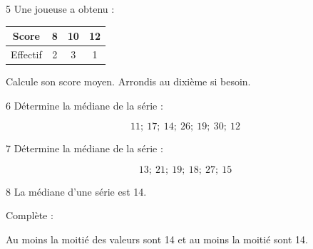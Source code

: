 \documentclass[9.5pt,a4paper,landscape]{article}
\begin{document}

\noindent
\begin{minipage}[t]{0.242\linewidth}
\begin{exo}{5}
Une joueuse a obtenu :

\begin{center}
\begin{tabular}{c|ccc}
Score & 8 & 10 & 12\\
\hline
Effectif & 2 & 3 & 1
\end{tabular}
\end{center}

Calcule son score moyen.
Arrondis au dixième si besoin.
\end{exo}
\end{minipage}
\hfill
%
\begin{minipage}[t]{0.242\linewidth}
\begin{exo}{6}
Détermine la médiane de la série :

\[
11;\ 17;\ 14;\ 26;\ 19;\ 30;\ 12
\]
\end{exo}
\end{minipage}
\hfill
%
\begin{minipage}[t]{0.242\linewidth}
\begin{exo}{7}
Détermine la médiane de la série :

\[
13;\ 21;\ 19;\ 18;\ 27;\ 15
\]
\end{exo}
\end{minipage}
\hfill
%
\begin{minipage}[t]{0.242\linewidth}
\begin{exo}{8}
La médiane d'une série est 14.

\medskip
Complète :

Au moins la moitié des valeurs sont \dotfill{} 14
et au moins la moitié sont \dotfill{} 14.
\end{exo}
\end{minipage}

\vspace{0.16cm}

\end{document}
